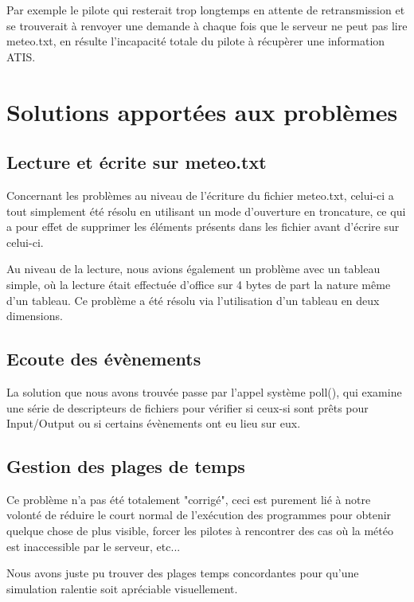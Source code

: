 \documentclass{report}
\begin{document}
{			Par exemple le pilote qui resterait trop longtemps en attente de retransmission et se trouverait à renvoyer une demande à chaque fois que le serveur ne peut pas lire meteo.txt, en résulte l'incapacité totale du pilote à récupèrer une information ATIS.

	\section{Solutions apportées aux problèmes}

		\subsection{Lecture et écrite sur meteo.txt}

			Concernant les problèmes au niveau de l'écriture du fichier meteo.txt, celui-ci a tout simplement été résolu en utilisant un mode d'ouverture en troncature, ce qui a pour effet de supprimer les éléments présents dans les fichier avant d'écrire sur celui-ci.

			Au niveau de la lecture, nous avions également un problème avec un tableau simple, où la lecture était effectuée d'office sur 4 bytes de part la nature même d'un tableau. Ce problème a été résolu via l'utilisation d'un tableau en deux dimensions.

		\subsection{Ecoute des évènements}

			La solution que nous avons trouvée passe par l'appel système poll(), qui examine une série de descripteurs de fichiers pour vérifier si ceux-si sont prêts pour Input/Output ou si certains évènements ont eu lieu sur eux. \cite{bsdSysCalls} 

		\subsection{Gestion des plages de temps}

			Ce problème n'a pas été totalement "corrigé", ceci est purement lié à notre volonté de réduire le court normal de l'exécution des programmes pour obtenir quelque chose de plus visible, forcer les pilotes à rencontrer des cas où la météo est inaccessible par le serveur, etc...

			Nous avons juste pu trouver des plages temps concordantes pour qu'une simulation ralentie soit apréciable visuellement.

}
\end{document}
